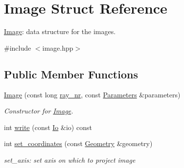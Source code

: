 \hypertarget{structImage}{}\section{Image Struct Reference}
\label{structImage}


\mbox{\hyperlink{structImage}{Image}}\+: data structure for the images.  




{\ttfamily \#include $<$image.\+hpp$>$}

\subsection*{Public Member Functions}
\begin{DoxyCompactItemize}
\item 
\mbox{\label{structImage_a20f4e6ffdb814623fa290d73bb1e797c}} 
\mbox{\hyperlink{structImage_a20f4e6ffdb814623fa290d73bb1e797c}{Image}} (const long \mbox{\hyperlink{structImage_a96b20b62cef09709597a8c96559d0fa8}{ray\+\_\+nr}}, const \mbox{\hyperlink{classParameters}{Parameters}} \&parameters)
\begin{DoxyCompactList}\small\item\em Constructor for \mbox{\hyperlink{structImage}{Image}}. \end{DoxyCompactList}\item 
int \mbox{\hyperlink{structImage_a9b3922e23578e6e8f5f471c327c1b250}{write}} (const \mbox{\hyperlink{structIo}{Io}} \&io) const
\item 
\mbox{\label{structImage_a9b5b0b4da304a0cebacabedfe9759c3e}} 
int \mbox{\hyperlink{structImage_a9b5b0b4da304a0cebacabedfe9759c3e}{set\+\_\+coordinates}} (const \mbox{\hyperlink{structGeometry}{Geometry}} \&geometry)
\begin{DoxyCompactList}\small\item\em set\+\_\+axis\+: set axis on which to project image \end{DoxyCompactList}\end{DoxyCompactItemize}
